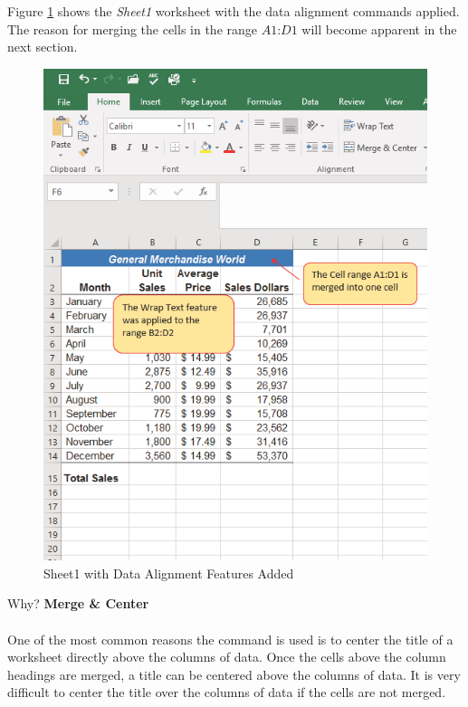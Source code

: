 Figure \ref{01:fig40} shows the \textit{Sheet1} worksheet with the data alignment commands applied. The reason for merging the cells in the range $ A1 $:$ D1 $ will become apparent in the next section.

\begin{figure}[H]
	\centering
	\includegraphics[width=\maxwidth{.95\linewidth}]{gfx/ch01_fig40}
	\caption{Sheet1 with Data Alignment Features Added}
	\label{01:fig40}
\end{figure}

\begin{center}
	\begin{infobox}{Why?}
		\textbf{Merge \& Center}
		\\
		\\
		One of the most common reasons the  command is used is to center the title of a worksheet directly above the columns of data. Once the cells above the column headings are merged, a title can be centered above the columns of data. It is very difficult to center the title over the columns of data if the cells are not merged.
	\end{infobox}
\end{center}

